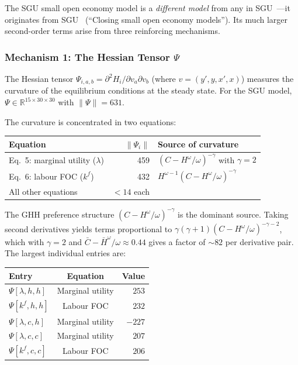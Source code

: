 \documentclass[11pt,a4paper]{article}
\theoremstyle{definition}
\begin{document}
	The SGU small open economy model is a \emph{different model} from any in SGU~\cite{sgu2004}---it originates from SGU~\cite{sgu2003} (``Closing small open economy models'').
	Its much larger second-order terms arise from three reinforcing mechanisms.

	\subsubsection{Mechanism 1: The Hessian Tensor $\Psi$}

	The Hessian tensor $\Psi_{i,a,b} = \partial^2 H_i / \partial v_a \partial v_b$ (where $v = (y', y, x', x)$) measures the curvature of the equilibrium conditions at the steady state.
	For the SGU model, $\Psi \in \mathbb{R}^{15 \times 30 \times 30}$ with $\|\Psi\| = 631$.

	The curvature is concentrated in two equations:
	\begin{center}
	\begin{tabular}{lrl}
		\toprule
		\textbf{Equation} & $\|\Psi_i\|$ & \textbf{Source of curvature} \\
		\midrule
		Eq.~5: marginal utility ($\lambda$) & 459 & $(C - H^\omega/\omega)^{-\gamma}$ with $\gamma = 2$ \\
		Eq.~6: labour FOC ($k^f$)           & 432 & $H^{\omega-1}(C - H^\omega/\omega)^{-\gamma}$ \\
		All other equations                  & $< 14$ each & \\
		\bottomrule
	\end{tabular}
	\end{center}

	The GHH preference structure $(C - H^\omega/\omega)^{-\gamma}$ is the dominant source.
	Taking second derivatives yields terms proportional to $\gamma(\gamma+1)(C - H^\omega/\omega)^{-\gamma-2}$, which with $\gamma = 2$ and $\bar{C} - \bar{H}^\omega/\omega \approx 0.44$ gives a factor of $\sim 82$ per derivative pair.
	The largest individual entries are:

	\begin{center}
	\begin{tabular}{lcr}
		\toprule
		\textbf{Entry} & \textbf{Equation} & \textbf{Value} \\
		\midrule
		$\Psi[\lambda, h, h]$ & Marginal utility & $253$ \\
		$\Psi[k^f, h, h]$ & Labour FOC & $232$ \\
		$\Psi[\lambda, c, h]$ & Marginal utility & $-227$ \\
		$\Psi[\lambda, c, c]$ & Marginal utility & $207$ \\
		$\Psi[k^f, c, c]$ & Labour FOC & $206$ \\
		\bottomrule
	\end{tabular}
	\end{center}
\end{document}
